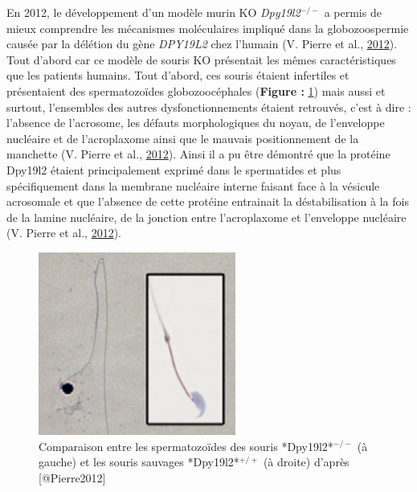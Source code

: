 \documentclass[12pt,twoside]{reedthesis}
\theoremstyle{definition}
\theoremstyle{definition}
\theoremstyle{remark}
\begin{document}
  En 2012, le développement d'un modèle murin KO \emph{Dpy19l2}\(^{-/-}\)
  a permis de mieux comprendre les mécanismes moléculaires impliqué dans
  la globozoospermie causée par la délétion du gène \emph{DPY19L2} chez
  l'humain (V. Pierre et al., \protect\hyperlink{ref-Pierre2012}{2012}).
  Tout d'abord car ce modèle de souris KO présentait les mêmes
  caractéristiques que les patients humains. Tout d'abord, ces souris
  étaient infertiles et présentaient des spermatozoïdes globozoocéphales
  (\textbf{Figure : }\ref{fig:mouseglobo}) mais aussi et surtout,
  l'ensembles des autres dysfonctionnements étaient retrouvés, c'est à
  dire : l'absence de l'acrosome, les défauts morphologiques du noyau, de
  l'enveloppe nucléaire et de l'acroplaxome ainsi que le mauvais
  positionnement de la manchette (V. Pierre et al.,
  \protect\hyperlink{ref-Pierre2012}{2012}). Ainsi il a pu être démontré
  que la protéine Dpy19l2 étaient principalement exprimé dans le
  spermatides et plus spécifiquement dans la membrane nucléaire interne
  faisant face à la vésicule acrosomale et que l'absence de cette protéine
  entrainait la déstabilisation à la fois de la lamine nucléaire, de la
  jonction entre l'acroplaxome et l'enveloppe nucléaire (V. Pierre et al.,
  \protect\hyperlink{ref-Pierre2012}{2012}).
  
  \begin{figure}
  
  {\centering \includegraphics[scale=0.8]{figure/mouse_globo_spz} 
  
  }
  
  \caption[Comparaison entre les spermatozoïdes des souris *Dpy19l2*$^{-/-}$ (à gauche) et les souris sauvages *Dpy19l2*$^{+/+}$ (à droite)]{Comparaison entre les spermatozoïdes des souris *Dpy19l2*$^{-/-}$ (à gauche) et les souris sauvages *Dpy19l2*$^{+/+}$ (à droite) d'après [@Pierre2012]}\label{fig:mouseglobo}
  \end{figure}
  
\end{document}
